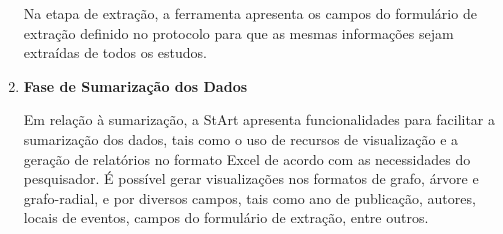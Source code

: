 \begin{enumerate}
    Na etapa de extração, a ferramenta apresenta os campos do formulário de extração definido no protocolo para que as mesmas informações sejam extraídas de todos os estudos.
    
    \item \textbf{Fase de Sumarização dos Dados}
    
    Em relação à sumarização, a StArt apresenta funcionalidades para facilitar a sumarização dos dados, tais como o uso de recursos de visualização e a geração de relatórios no formato Excel de acordo com as necessidades do pesquisador. É possível gerar visualizações nos formatos de grafo, árvore e grafo-radial, e por diversos campos, tais como ano de publicação, autores, locais de eventos, campos do formulário de extração, entre outros.
    
\end{enumerate}